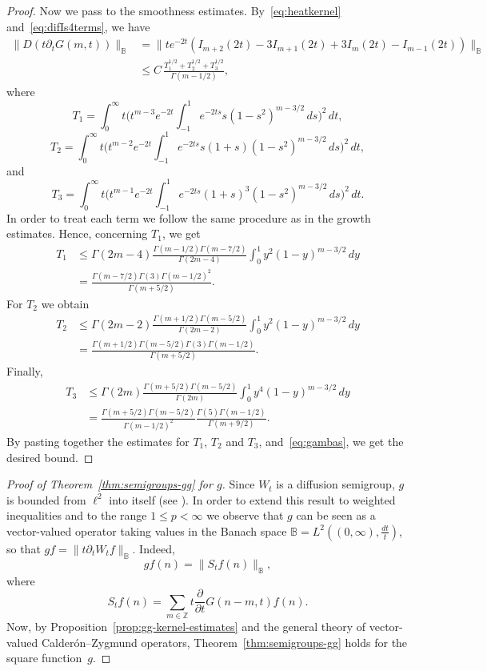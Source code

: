 \documentclass[11pt]{amsart}
\numberwithin{equation}{section}
\newcommand{\Z}{\mathbb{Z}}
\theoremstyle{plain}
\theoremstyle{remark}
\begin{document}
\begin{proof}
Now we pass to the smoothness estimates. By~\eqref{eq:heatkernel} and~\eqref{eq:difIs4terms}, we have
\begin{align*}
\|D(t\partial_tG(m,t))\|_{\mathbb{B}}
&= \|te^{-2t} (I_{m+2}(2t) - 3I_{m+1}(2t) + 3I_{m}(2t)-I_{m-1}(2t))\|_{\mathbb{B}}\\
&\le C \,\frac{T_1^{1/2}+T_2^{1/2}+T_3^{1/2}}{\Gamma(m-1/2)},
\end{align*}
where
\[
T_1 = \int_0^{\infty}t\Big(t^{m-3}e^{-2t}
\int_{-1}^1e^{-2ts}s(1-s^2)^{m-3/2}\,ds\Big)^2\,dt,
\]
\[
T_2 = \int_0^{\infty}t\Big(t^{m-2}e^{-2t}
\int_{-1}^1e^{-2ts}s(1+s)(1-s^2)^{m-3/2}\,ds\Big)^2\,dt,
\]
and
\[
T_3 = \int_0^{\infty}t\Big(t^{m-1}e^{-2t}
\int_{-1}^1e^{-2ts}(1+s)^3(1-s^2)^{m-3/2}\,ds\Big)^2\,dt.
\]
In order to treat each term we follow the same procedure as in the growth estimates. Hence, concerning $T_1$, we get
\begin{align*}
T_1&
\le \Gamma(2m-4)\frac{\Gamma(m-1/2)\Gamma(m-7/2)}{\Gamma(2m-4)}\int_{0}^1y^{2}
(1-y)^{m-3/2}
\,dy\\
&=\frac{\Gamma(m-7/2)\Gamma(3)\Gamma(m-1/2)^2}{\Gamma(m+5/2)}.
\end{align*}
For $T_2$ we obtain
\begin{align*}
T_2
&\le \Gamma(2m-2)\frac{\Gamma(m+1/2)\Gamma(m-5/2)}{\Gamma(2m-2)}\int_{0}^1y^{2}
(1-y)^{m-3/2}
\,dy\\
&=\frac{\Gamma(m+1/2)\Gamma(m-5/2)\Gamma(3)\Gamma(m-1/2)}{\Gamma(m+5/2)}.
\end{align*}
Finally,
\begin{align*}
T_3
&\le \Gamma(2m)\frac{\Gamma(m+5/2)\Gamma(m-5/2)}{\Gamma(2m)}\int_{0}^1y^{4}(1-y)^{m-3/2}\,dy
\\
&=\frac{\Gamma(m+5/2)\Gamma(m-5/2)}{\Gamma(m-1/2)^2}
\frac{\Gamma(5)\Gamma(m-1/2)}{\Gamma(m+9/2)}.
\end{align*}
By pasting together the estimates for $T_1$, $T_2$ and $T_3$, and~\eqref{eq:gambas}, we get the desired bound.
\end{proof}

\begin{proof}[Proof of Theorem~\ref{thm:semigroups-gg} for $g$]
Since $W_t$ is a diffusion semigroup, $g$ is bounded from $\ell^2$ into itself (see \cite[p.~74]{St-rojo}). In order to extend this result to weighted inequalities and to the range $1\le p<\infty$ we observe that $g$ can be seen as a vector-valued operator taking values in the Banach space $\mathbb{B}=L^2((0,\infty),\frac{dt}{t})$, so that $gf=\|t\partial_tW_tf\|_{\mathbb{B}}$. Indeed,
\[
gf(n)=\|S_tf(n)\|_{\mathbb{B}},
\]
where
\[
S_tf(n) = \sum_{m\in \Z}t \frac{\partial}{\partial t}G(n-m,t)f(n).
\]
Now, by Proposition~\ref{prop:gg-kernel-estimates} and the general theory of vector-valued Calder\'on--Zygmund operators, Theorem~\ref{thm:semigroups-gg} holds for the square function~$g$.
\end{proof}
\end{document}
